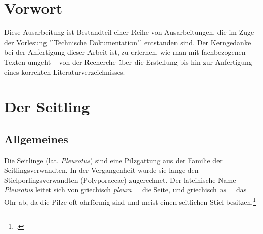 \documentclass[a4paper,abstracton]{scrreprt}
\begin{document}


\tableofcontents
\pagebreak
\listoffigures

\begin{abstract}
\begin{quote}%
Unter dem Schirmthema \emph{Heimische Pilze} beschäftigt sich diese Ausarbeitung mit den Seitlingen (lat.: "'Pleurotus"'). Es werden unter anderem Kenntnisse über Allgemeinheiten, das Vorkommen, die Beschreibung des Pilzes sowie die bei Pilzen so wichtigen Verwechslungsmöglichkeiten vermittelt. Weiterhin wird eine Auswahl ausgesuchter Arten einzeln betrachtet.
\end{quote} 
\end{abstract}

\chapter{Vorwort}
Diese Ausarbeitung ist Bestandteil einer Reihe von Ausarbeitungen, die im Zuge der Vorlesung "'Technische Dokumentation"' entstanden sind. Der Kerngedanke bei der Anfertigung dieser Arbeit ist, zu erlernen, wie man mit fachbezogenen Texten umgeht -- von der Recherche über die Erstellung bis hin zur Anfertigung eines korrekten Literaturverzeichnisses. 

\chapter{Der Seitling}
\section{Allgemeines}
Die Seitlinge (lat. \emph{Pleurotus}) sind eine Pilzgattung aus der Familie der Seitlingsverwandten. In der Vergangenheit wurde sie lange den Stielporlingsverwandten (Polyporaceae) zugerechnet. Der lateinische Name \emph{Pleurotus} leitet sich von griechisch \emph{pleura} = die Seite, und griechisch \emph{us} = das Ohr ab, da die Pilze oft ohrförmig sind und meist einen seitlichen Stiel besitzen.\footcite{faktenuber} 
\end{document}
